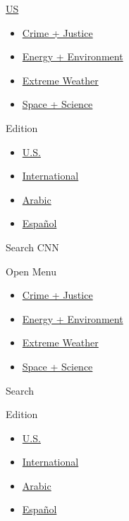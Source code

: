 \href{/us}{US}

\begin{itemize}
\tightlist
\item
  \href{/specials/us/crime-and-justice}{Crime + Justice}
\item
  \href{/specials/us/energy-and-environment}{Energy + Environment}
\item
  \href{/specials/us/extreme-weather}{Extreme Weather}
\item
  \href{/specials/space-science}{Space + Science}
\end{itemize}

Edition

\begin{itemize}
\tightlist
\item
  \href{//us.cnn.com?hpt=header_edition-picker}{U.S.}
\item
  \href{//edition.cnn.com?hpt=header_edition-picker}{International}
\item
  \href{//arabic.cnn.com?hpt=header_edition-picker}{Arabic}
\item
  \href{//cnnespanol.cnn.com?hpt=header_edition-picker}{Español}
\end{itemize}

Search CNN

Open Menu

\begin{itemize}
\tightlist
\item
  \href{/specials/us/crime-and-justice}{Crime + Justice}
\item
  \href{/specials/us/energy-and-environment}{Energy + Environment}
\item
  \href{/specials/us/extreme-weather}{Extreme Weather}
\item
  \href{/specials/space-science}{Space + Science}
\end{itemize}

Search

Edition

\begin{itemize}
\tightlist
\item
  \href{//us.cnn.com?hpt=header_edition-picker}{U.S.}
\item
  \href{//edition.cnn.com?hpt=header_edition-picker}{International}
\item
  \href{//arabic.cnn.com?hpt=header_edition-picker}{Arabic}
\item
  \href{//cnnespanol.cnn.com?hpt=header_edition-picker}{Español}
\end{itemize}

